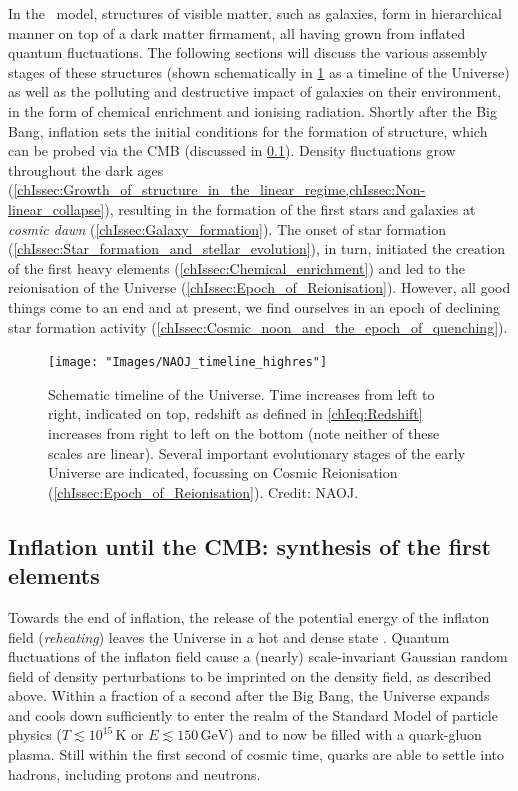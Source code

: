 In the \LCDM\ model, structures of visible matter, such as galaxies, form in hierarchical manner on top of a dark matter firmament, all having grown from inflated quantum fluctuations. The following sections will discuss the various assembly stages of these structures (shown schematically in \cref{chIfig:Cosmic_timeline} as a timeline of the Universe) as well as the polluting and destructive impact of galaxies on their environment, in the form of chemical enrichment and ionising radiation. Shortly after the Big Bang, inflation sets the initial conditions for the formation of structure, which can be probed via the CMB (discussed in \cref{chIssec:Inflation_until_CMB}). Density fluctuations grow throughout the dark ages (\cref{chIssec:Growth_of_structure_in_the_linear_regime,chIssec:Non-linear_collapse}), resulting in the formation of the first stars and galaxies at \textit{cosmic dawn} (\cref{chIssec:Galaxy_formation}). The onset of star formation (\cref{chIssec:Star_formation_and_stellar_evolution}), in turn, initiated the creation of the first heavy elements (\cref{chIssec:Chemical_enrichment}) and led to the reionisation of the Universe (\cref{chIssec:Epoch_of_Reionisation}). However, all good things come to an end and at present, we find ourselves in an epoch of declining star formation activity (\cref{chIssec:Cosmic_noon_and_the_epoch_of_quenching}).
\begin{figure}[t]
    \centering
    \texttt{[image: "Images/NAOJ\_timeline\_highres"]}
    \caption[Schematic timeline of the Universe.]{Schematic timeline of the Universe. Time increases from left to right, indicated on top, redshift as defined in \cref{chIeq:Redshift} increases from right to left on the bottom (note neither of these scales are linear). Several important evolutionary stages of the early Universe are indicated, focussing on Cosmic Reionisation (\cref{chIssec:Epoch_of_Reionisation}). Credit: NAOJ.}
    \label{chIfig:Cosmic_timeline}
\end{figure}

\subsection{Inflation until the CMB: synthesis of the first elements}
\label{chIssec:Inflation_until_CMB}

Towards the end of inflation, the release of the potential energy of the inflaton field (\textit{reheating}) leaves the Universe in a hot and dense state \citep[ultimately the source of the blackbody nature of the CMB;][]{1994PhRvL..73.3195K}. Quantum fluctuations of the inflaton field cause a (nearly) scale-invariant Gaussian random field of density perturbations to be imprinted on the density field, as described above. Within a fraction of a second after the Big Bang, the Universe expands and cools down sufficiently to enter the realm of the Standard Model of particle physics ($T \lesssim 10^{15} \, \mathrm{K}$ or $E \lesssim 150 \, \mathrm{GeV}$) and to now be filled with a quark-gluon plasma. Still within the first second of cosmic time, quarks are able to settle into hadrons, including protons and neutrons.

